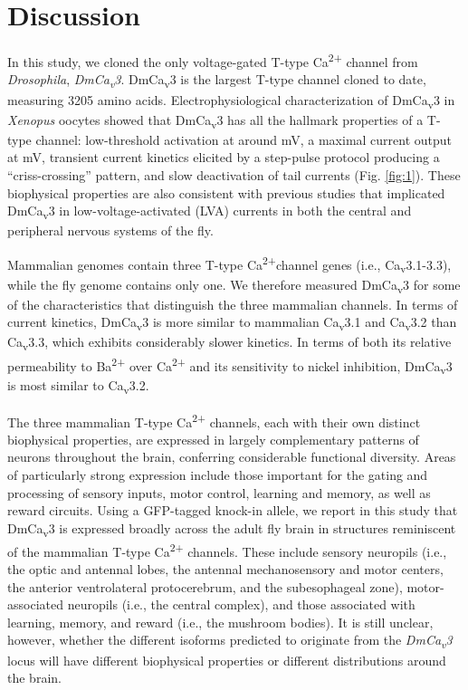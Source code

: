 \section*{Discussion}

In this study, we cloned the only voltage-gated T-type Ca\textsuperscript{2+} channel from \emph{Drosophila}, \emph{DmCa\textsubscript{v}3}.
DmCa\textsubscript{v}3 is the largest T-type channel cloned to date, measuring 3205 amino acids\cite{senatore:2010aa}.
Electrophysiological characterization of DmCa\textsubscript{v}3 in \emph{Xenopus} oocytes showed that DmCa\textsubscript{v}3 has all the hallmark properties of a T-type channel: low-threshold activation at around  mV, a maximal current output at  mV, transient current kinetics elicited by a step-pulse protocol producing a ``criss-crossing'' pattern, and slow deactivation of tail currents (Fig. \ref{fig:1}).
These biophysical properties are also consistent with previous studies that implicated DmCa\textsubscript{v}3 in low-voltage-activated (LVA) currents in both the central and peripheral nervous systems of the fly\cite{Ryglewski:2012jk, Iniguez:2013ib}.

Mammalian genomes contain three T-type Ca\textsuperscript{2+}channel genes (i.e., Ca\textsubscript{v}3.1-3.3), while the fly genome contains only one.
We therefore measured DmCa\textsubscript{v}3 for some of the characteristics that distinguish the three mammalian channels.
In terms of current kinetics, DmCa\textsubscript{v}3 is more similar to mammalian Ca\textsubscript{v}3.1 and Ca\textsubscript{v}3.2 than Ca\textsubscript{v}3.3, which exhibits considerably  slower kinetics.
In terms of both its relative permeability to Ba\textsuperscript{2+} over Ca\textsuperscript{2+} and its sensitivity to nickel inhibition, DmCa\textsubscript{v}3 is most similar to Ca\textsubscript{v}3.2\cite{kang:2006aa, park:2013aa}.

The three mammalian T-type Ca\textsuperscript{2+} channels,  each with their own distinct biophysical properties, are expressed in largely complementary patterns of neurons throughout the brain, conferring considerable functional diversity.
Areas of particularly strong expression include those important for the gating and processing of sensory inputs, motor control, learning and memory, as well as reward circuits\cite{talley:1999aa}. 
Using a GFP-tagged knock-in allele, we report in this study that DmCa\textsubscript{v}3 is expressed broadly across the adult fly brain in structures reminiscent of the mammalian T-type Ca\textsuperscript{2+} channels.
These include sensory neuropils (i.e., the optic and antennal lobes, the antennal mechanosensory and motor centers, the anterior ventrolateral protocerebrum, and the subesophageal zone), motor-associated neuropils (i.e., the central complex), and those associated with learning, memory, and reward (i.e., the mushroom bodies).
It is still unclear, however, whether the different isoforms predicted to originate from the \emph{DmCa\textsubscript{v}3} locus will have different biophysical properties or different distributions around the brain. 

